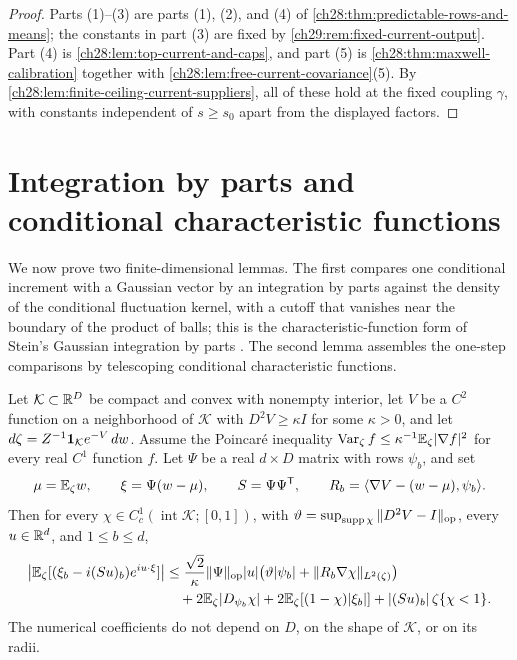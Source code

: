 \begin{proof}
Parts (1)--(3) are parts (1), (2), and (4) of \cref{ch28:thm:predictable-rows-and-means}; the constants in part (3) are fixed by \cref{ch29:rem:fixed-current-output}. Part (4) is \cref{ch28:lem:top-current-and-caps}, and part (5) is \cref{ch28:thm:maxwell-calibration} together with \cref{ch28:lem:free-current-covariance}(5). By \cref{ch28:lem:finite-ceiling-current-suppliers}, all of these hold at the fixed coupling $\gamma$, with constants independent of $s\ge s_0$ apart from the displayed factors.
\end{proof}

\section{Integration by parts and conditional characteristic functions}\label{ch29:sec:stein}

We now prove two finite-dimensional lemmas. The first compares one conditional increment with a Gaussian vector by an integration by parts against the density of the conditional fluctuation kernel, with a cutoff that vanishes near the boundary of the product of balls; this is the characteristic-function form of Stein's Gaussian integration by parts \cite{Stein1972NormalApproximation}. The second lemma assembles the one-step comparisons by telescoping conditional characteristic functions.

\begin{lemma}\label{ch29:lem:fiber-and-martingale-stein}
Let $\mathcal K\subset\mathbb R^D$ be compact and convex with nonempty interior, let $V$ be a $C^2$ function on a neighborhood of $\mathcal K$ with $D^2V\ge\kappa I$ for some $\kappa>0$, and let $d\zeta=Z^{-1}\mathbf 1_{\mathcal K}e^{-V}\,dw$. Assume the Poincaré inequality $\operatorname{Var}_\zeta f\le\kappa^{-1}\mathbb E_\zeta|\nabla f|^2$ for every real $C^1$ function $f$. Let $\Psi$ be a real $d\times D$ matrix with rows $\psi_b$, and set
\[
 \mu=\mathbb E_\zeta w,\qquad \xi=\Psi(w-\mu),\qquad S=\Psi\Psi^{\mathsf T},\qquad R_b=\langle\nabla V-(w-\mu),\psi_b\rangle.
\]
Then for every $\chi\in C_c^1(\operatorname{int}\mathcal K;[0,1])$, with $\vartheta=\sup_{\operatorname{supp}\chi}\|D^2V-I\|_{\rm op}$, every $u\in\mathbb R^d$, and $1\le b\le d$,
\begin{align*}
 \bigl|\mathbb E_\zeta[(\xi_b-i(Su)_b)e^{iu\cdot\xi}]\bigr|&\le\frac{\sqrt2}\kappa\|\Psi\|_{\rm op}|u|\bigl(\vartheta|\psi_b|+\|R_b\nabla\chi\|_{L^2(\zeta)}\bigr)\\
 &\quad+2\mathbb E_\zeta|D_{\psi_b}\chi|+2\mathbb E_\zeta[(1-\chi)|\xi_b|]+|(Su)_b|\,\zeta\{\chi<1\}.
\end{align*}
The numerical coefficients do not depend on $D$, on the shape of $\mathcal K$, or on its radii.
\end{lemma}

